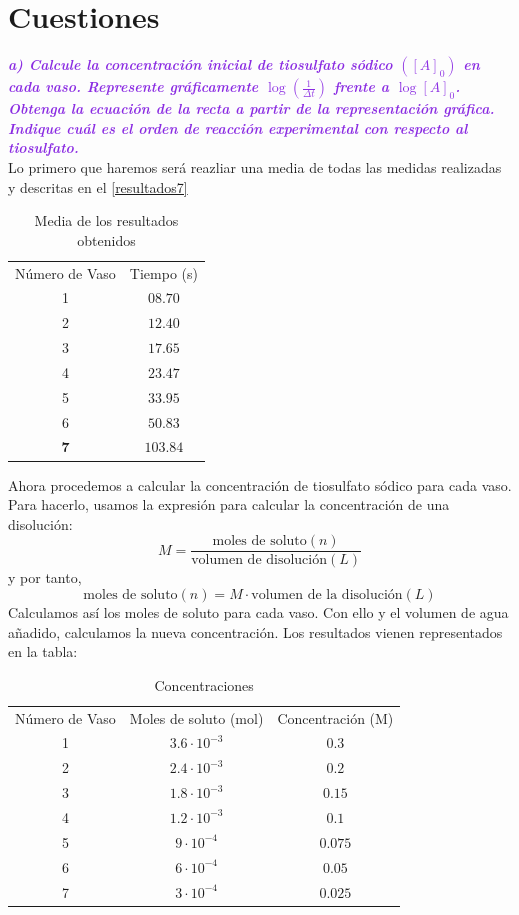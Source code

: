 \section{Cuestiones}
\noindent\textcolor{BlueViolet}{\textbf{\textit{a) Calcule la concentración inicial de tiosulfato sódico $([A]_0)$ en cada vaso. Represente gráficamente $\log(\frac{1}{\Delta t})$ frente a $\log[A]_0$. Obtenga la ecuación de la recta a partir de la representación gráfica. Indique cuál es el orden de reacción experimental con respecto
al tiosulfato.}}}\\
\noindent Lo primero que haremos será reazliar una media de todas las medidas realizadas y descritas en el \ref{resultados7}
\begin{table}[H]
\centering
\begin{tabular}{cc}
\rowcolor[HTML]{F6D594} 
Número de Vaso & Tiempo (s) \\
\rowcolor[HTML]{EAEABE} 
1 & $08.70$ \\
2 & $12.40$ \\
\rowcolor[HTML]{EAEABE} 
3 & $17.65$ \\
4 & $23.47$ \\
\rowcolor[HTML]{EAEABE} 
5 & $33.95$ \\
6 & $50.83$ \\
\rowcolor[HTML]{EAEABE} 
\textbf{7} & $103.84$
\end{tabular}
\caption{Media de los resultados obtenidos}
\label{tab:my-table}
\end{table}
\noindent Ahora procedemos a calcular la concentración de tiosulfato sódico para cada vaso. Para hacerlo, usamos la expresión para calcular la concentración de una disolución:
\[M = \frac{\text{moles de soluto} (\si{n})}{\text{volumen de disolución} (\si{L})}\]
y por tanto,
\[\text{moles de soluto} (\si{n}) = M \cdot \text{volumen de la disolución} (\si{L})\]
\noindent Calculamos así los moles de soluto para cada vaso. Con ello y el volumen de agua añadido, calculamos la nueva concentración. Los resultados vienen representados en la tabla:
\begin{table}[H]
\centering
\begin{tabular}{ccc}
\rowcolor[HTML]{F6D594} 
Número de Vaso & Moles de soluto (\si{mol}) & Concentración (\si{M}) \\
\rowcolor[HTML]{EAEABE} 
1 & $3.6\cdot10^{-3}$ & $0.3$ \\
2 & $2.4\cdot10^{-3}$ & $0.2$ \\
\rowcolor[HTML]{EAEABE} 
3 & $1.8\cdot10^{-3}$ & $0.15$ \\
4 & $1.2\cdot10^{-3}$ & $0.1$ \\
\rowcolor[HTML]{EAEABE} 
5 & $9\cdot10^{-4}$ & $0.075$ \\
6 & $6\cdot10^{-4}$ & $0.05$ \\
\rowcolor[HTML]{EAEABE} 
7 & $3\cdot10^{-4}$ & $0.025$
\end{tabular}
\caption{Concentraciones}
\label{concentraao}
\end{table}
\clearpage

